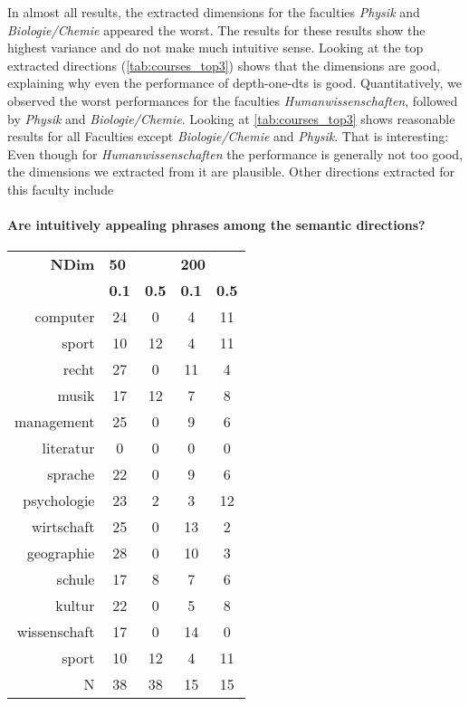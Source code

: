 In almost all results, the extracted dimensions for the faculties \textit{Physik} and \textit{Biologie/Chemie} appeared the worst. The results for these results show the highest variance and do not make much intuitive sense. Looking at the top extracted directions (\autoref{tab:courses_top3}) shows that the dimensions are good, explaining why even the performance of depth-one-\glspl{dt} is good. Quantitatively, we observed the worst performances for the faculties \textit{Humanwissenschaften}, followed by \textit{Physik} and \textit{Biologie/Chemie}. Looking at \autoref{tab:courses_top3} shows reasonable results for all Faculties except \textit{Biologie/Chemie} and \textit{Physik}. That is interesting: Even though for \textit{Humanwissenschaften} the performance is generally not too good, the dimensions we extracted from it are plausible. Other directions extracted for this faculty include \todo

\paragraph{Are intuitively appealing phrases among the semantic directions?}

\begingroup

\renewcommand{\arraystretch}{0.75}
\begin{table}[H]
	\begin{tabular}{rcccc}
	\toprule
	 \textbf{NDim} & \multicolumn{2}{l}{\textbf{50}} & \multicolumn{2}{l}{\textbf{200}} \\
	 & \textbf{0.1} & \textbf{0.5} & \textbf{0.1} & \textbf{0.5}  \\
	\midrule
	computer & 24 & 0 & 4 & 11 \\
	sport & 10 & 12 & 4 & 11 \\
	recht & 27 & 0 & 11 & 4 \\
	musik & 17 & 12 & 7 & 8 \\
	management & 25 & 0 & 9 & 6 \\
	literatur & 0 & 0 & 0 & 0 \\
	sprache & 22 & 0 & 9 & 6 \\
	psychologie & 23 & 2 & 3 & 12 \\
	wirtschaft & 25 & 0 & 13 & 2 \\
	geographie & 28 & 0 & 10 & 3 \\
	schule & 17 & 8 & 7 & 6 \\
	kultur & 22 & 0 & 5 & 8 \\
	wissenschaft & 17 & 0 & 14 & 0 \\
	sport & 10 & 12 & 4 & 11 \\
	N & 38 & 38 & 15 & 15 \\
	\bottomrule
\end{tabular}
\label{tab:appealing_phrases}
\end{table}
\endgroup
	

